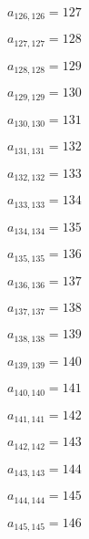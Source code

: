 \documentclass[a4paper,12pt]{article}
\begin{document}
$a _{ 126, 126 } = 127$

$a _{ 127, 127 } = 128$

$a _{ 128, 128 } = 129$

$a _{ 129, 129 } = 130$

$a _{ 130, 130 } = 131$

$a _{ 131, 131 } = 132$

$a _{ 132, 132 } = 133$

$a _{ 133, 133 } = 134$

$a _{ 134, 134 } = 135$

$a _{ 135, 135 } = 136$

$a _{ 136, 136 } = 137$

$a _{ 137, 137 } = 138$

$a _{ 138, 138 } = 139$

$a _{ 139, 139 } = 140$

$a _{ 140, 140 } = 141$

$a _{ 141, 141 } = 142$

$a _{ 142, 142 } = 143$

$a _{ 143, 143 } = 144$

$a _{ 144, 144 } = 145$

$a _{ 145, 145 } = 146$
\end{document}
